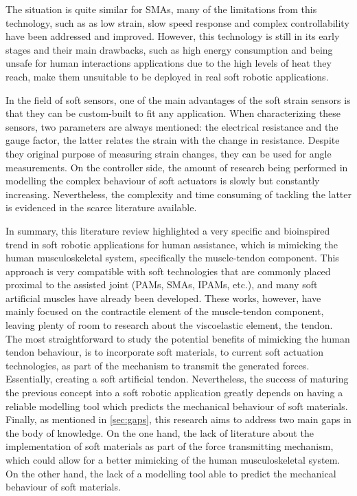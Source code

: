 The situation is quite similar for SMAs, many of the limitations from this technology, such as  as low strain, slow speed response and complex controllability have been addressed and improved. However, this technology is still in its early stages and their main drawbacks, such as high energy consumption and being unsafe for human interactions applications due to the high levels of heat they reach, make them unsuitable to be deployed in real soft robotic applications.

In the field of soft sensors, one of the main advantages of the soft strain sensors is that they can be custom-built to fit any application. When characterizing these sensors, two parameters are always mentioned: the electrical resistance and the gauge factor, the latter relates the strain with the change in resistance. Despite they original purpose of measuring strain changes, they can be used for angle measurements. On the controller side, the amount of research being performed in modelling the complex behaviour of soft actuators is slowly but constantly increasing. Nevertheless, the complexity and time consuming of tackling the latter is evidenced in the scarce literature available.

In summary, this literature review highlighted a very specific and bioinspired trend in soft robotic applications for human assistance, which is mimicking the human musculoskeletal system, specifically the muscle-tendon component. This approach is very compatible with soft technologies that are commonly placed proximal to the assisted joint (PAMs, SMAs, IPAMs, etc.), and many soft artificial muscles have already been developed. These works, however, have mainly focused on the contractile element of the muscle-tendon component, leaving plenty of room to research about the viscoelastic element, the tendon. The most straightforward to study the potential benefits of mimicking the human tendon behaviour, is to incorporate soft materials, to current soft actuation technologies, as part of the mechanism to transmit the generated forces. Essentially, creating a soft artificial tendon. Nevertheless, the success of maturing the previous concept into a soft robotic application greatly depends on having a reliable modelling tool which predicts the mechanical behaviour of soft materials. Finally, as mentioned in \autoref{sec:gaps}, this research aims to address two main gaps in the body of knowledge. On the one hand, the lack of literature about the implementation of soft materials as part of the force transmitting mechanism, which could allow for a better mimicking of the human musculoskeletal system. On the other hand, the lack of a modelling tool able to predict the mechanical behaviour of soft materials.
